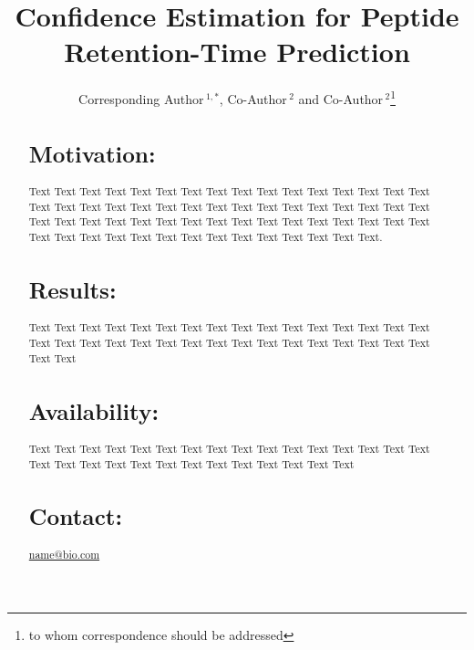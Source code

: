 \documentclass{bioinfo}
\begin{document}

\title[short Title]{Confidence Estimation for Peptide Retention-Time Prediction}
\author[Sample \textit{et~al}]{Corresponding Author\,$^{1,*}$, Co-Author\,$^{2}$ and Co-Author\,$^2$\footnote{to whom correspondence should be addressed}}
\address{$^{1}$Department of XXXXXXX, Address XXXX etc.\\
$^{2}$Department of XXXXXXXX, Address XXXX etc.}



\maketitle

\begin{abstract}

\section{Motivation:}
Text Text Text  Text Text Text Text Text Text Text Text
Text  Text Text Text Text Text Text Text Text Text  Text Text Text Text Text Text Text Text Text  Text Text Text Text Text Text Text Text Text  Text Text Text Text Text Text Text Text Text  Text Text Text Text Text Text Text Text Text  Text Text Text Text Text.

\section{Results:}
Text  Text Text Text Text Text Text Text Text Text  Text Text Text Text Text Text Text Text Text  Text Text Text Text Text Text Text Text Text  Text Text Text Text Text Text

\section{Availability:}
Text  Text Text Text Text Text Text Text Text Text  Text Text Text Text Text Text Text Text Text  Text Text Text Text Text Text Text Text Text  Text

\section{Contact:} \href{name@bio.com}{name@bio.com}
\end{abstract}
\end{document}

